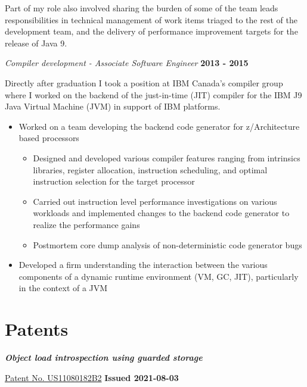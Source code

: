 \documentclass[margin,line]{res}
\begin{document}
\begin{resume}
\newpage

Part of my role also involved sharing the burden of some of the team leads responsibilities in technical management of
work items triaged to the rest of the development team, and the delivery of performance improvement targets for the
release of Java 9.

{\em Compiler development - Associate Software Engineer} \hfill {\bf 2013 - 2015}
\vspace{-.12in}

Directly after graduation I took a position at IBM Canada's compiler group where I worked on the backend of the
just-in-time (JIT) compiler for the IBM J9 Java Virtual Machine (JVM) in support of IBM platforms.

\vspace{.10in}

\begin{itemize}
\item Worked on a team developing the backend code generator for z/Architecture based processors
\begin{itemize}
\item Designed and developed various compiler features ranging from intrinsics libraries, register allocation,
instruction scheduling, and optimal instruction selection for the target processor
\item Carried out instruction level performance investigations on various workloads and implemented changes to
the backend code generator to realize the performance gains
\item Postmortem core dump analysis of non-deterministic code generator bugs
\end{itemize}
\item Developed a firm understanding the interaction between the various components of a dynamic runtime 
environment (VM, GC, JIT), particularly in the context of a JVM
\end{itemize}

\section{\sc Patents}

\begin{list}{}{\leftmargin=0cm}

\item {\em \bf Object load introspection using guarded storage}

\href{https://patents.google.com/patent/US11080182B2}{Patent No. US11080182B2} \hfill {\bf Issued 2021-08-03}


\end{list}
\end{resume}
\end{document}
